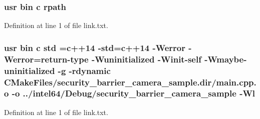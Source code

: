 \subsubsection[{\texorpdfstring{rpath}{rpath}}]{\setlength{\rightskip}{0pt plus 5cm}usr bin {\bf c} rpath}\hypertarget{security__barrier__camera__sample_2CMakeFiles_2security__barrier__camera__sample_8dir_2link_8txt_ab9d7fd7120fafa2118a4e08c1df697c7}{}\label{security__barrier__camera__sample_2CMakeFiles_2security__barrier__camera__sample_8dir_2link_8txt_ab9d7fd7120fafa2118a4e08c1df697c7}


Definition at line 1 of file link.\+txt.

\subsubsection[{\texorpdfstring{std}{std}}]{\setlength{\rightskip}{0pt plus 5cm}usr bin {\bf c} std ={\bf c}++14 -\/std={\bf c}++14 -\/Werror -\/Werror=return-\/type -\/Wuninitialized -\/Winit-\/self -\/Wmaybe-\/uninitialized -\/g -\/rdynamic C\+Make\+Files/security\+\_\+barrier\+\_\+camera\+\_\+sample.\+dir/main.\+cpp.\+o -\/o ../intel64/Debug/security\+\_\+barrier\+\_\+camera\+\_\+sample -\/{\bf Wl}}\hypertarget{security__barrier__camera__sample_2CMakeFiles_2security__barrier__camera__sample_8dir_2link_8txt_a1ccfea5f558575a112db71eeb271fabf}{}\label{security__barrier__camera__sample_2CMakeFiles_2security__barrier__camera__sample_8dir_2link_8txt_a1ccfea5f558575a112db71eeb271fabf}


Definition at line 1 of file link.\+txt.

